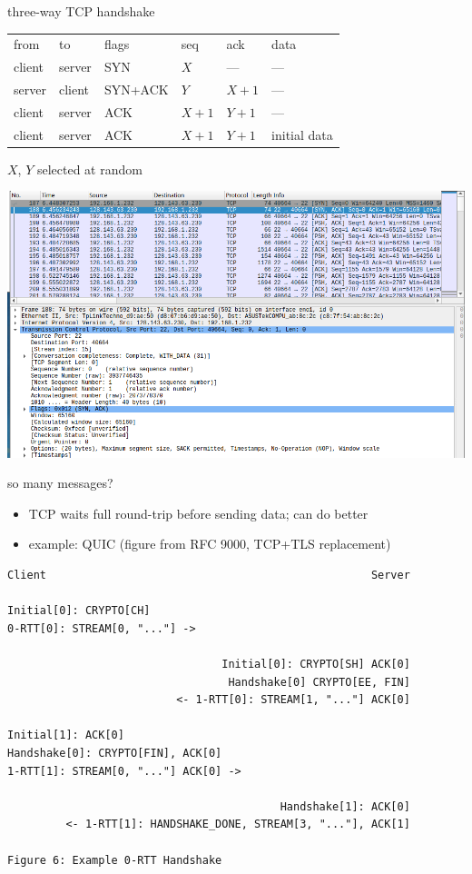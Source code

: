 \begin{frame}{three-way TCP handshake}
\begin{tabular}{l@{$\rightarrow$}l|llll}
from & to & flags & seq & ack & data\\
client & server & SYN & $X$ & --- & ---\\
server & client & SYN+ACK & $Y$ & $X+1$ & ---\\
client & server & ACK & $X+1$ & $Y+1$ & ---\\
client & server & ACK & $X+1$ & $Y+1$ & initial data  \\
\end{tabular}
$X$, $Y$ selected at random
\end{frame}

\begin{frame}
\includegraphics[width=\textwidth]{../sockets/tcp-handshake-wireshark}
\end{frame}

\begin{frame}[fragile]{so many messages?}
    \begin{itemize}
    \item TCP waits full round-trip before sending data; can do better
    \item example: QUIC (figure from RFC 9000, TCP+TLS replacement)
    \end{itemize}
\begin{Verbatim}[fontsize=\fontsize{8}{9}\selectfont]
Client                                                  Server

Initial[0]: CRYPTO[CH]
0-RTT[0]: STREAM[0, "..."] ->

                                 Initial[0]: CRYPTO[SH] ACK[0]
                                  Handshake[0] CRYPTO[EE, FIN]
                          <- 1-RTT[0]: STREAM[1, "..."] ACK[0]

Initial[1]: ACK[0]
Handshake[0]: CRYPTO[FIN], ACK[0]
1-RTT[1]: STREAM[0, "..."] ACK[0] ->

                                          Handshake[1]: ACK[0]
         <- 1-RTT[1]: HANDSHAKE_DONE, STREAM[3, "..."], ACK[1]

Figure 6: Example 0-RTT Handshake
\end{Verbatim}
\end{frame}
